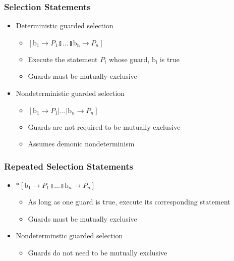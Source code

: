 \documentclass[compress]{beamer}
\begin{document}
\begin{frame}
\frametitle{Selection Statements}
\begin{itemize}
\item Deterministic guarded selection
\begin{itemize}
\item $[\mathrm{b_1} \rightarrow P_1 \talloblong \ldots \talloblong \mathrm{b_n} \rightarrow P_n]$
\item Execute the statement $P_i$ whose guard, $\mathrm{b_i}$ is true
\item Guards must be mutually exclusive
\end{itemize}
\pause
\item Nondeterministic guarded selection
\begin{itemize}
\item $ [\textrm{b}_1 \rightarrow P_1 | \ldots | \textrm{b}_n \rightarrow P_n ] $
\item Guards are not required to be mutually exclusive
\item Assumes demonic nondeterminism
\end{itemize}
\end{itemize}
\end{frame}
\begin{frame}
\frametitle{Repeated Selection Statements}
\begin{itemize}
\item  $*[\textrm{b}_1 \rightarrow P_1 \talloblong \ldots \talloblong \textrm{b}_n \rightarrow P_n]$
\begin{itemize}
\item As long as one guard is true, execute its corresponding statement
\item Guards must be mutually exclusive
\end{itemize}
\pause
\item Nondeterminstic guarded selection
\begin{itemize}
\item Guards do not need to be mutually exclusive
\end{itemize}
\end{itemize}
\end{frame}
\end{document}
